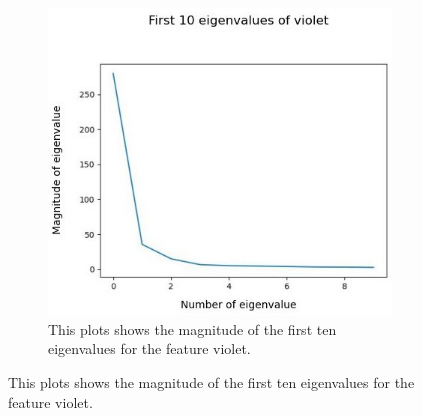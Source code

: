 
\begin{figure}[H]
	\centering
	\begin{subfigure}{0.7\textwidth}
		\includegraphics[width=0.9\linewidth]{Figures/chapter04/pca_violet_graph.png} 
		\caption{This plots shows the magnitude of the first ten eigenvalues for the feature violet.}
	\end{subfigure}
	\vspace{20pt}
	

\end{figure}
